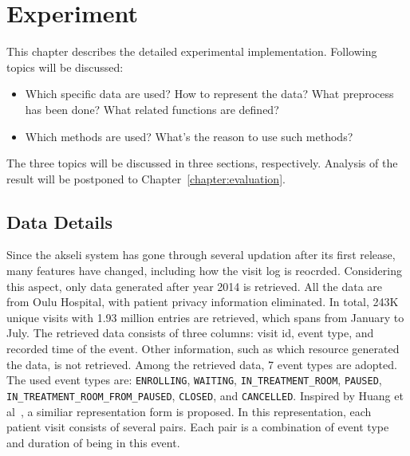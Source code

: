 \chapter{Experiment}
\label{chapter:Experiment}

	
This chapter describes the detailed experimental implementation. Following topics will be discussed:
\begin{itemize}
	\item	Which specific data are used? How to represent the data? What preprocess has been done? What related functions are defined?
	\item	Which methods are used? What's the reason to use such methods? 
\end{itemize}
The three topics will be discussed in three sections, respectively. Analysis of the result will be postponed to Chapter~\ref{chapter:evaluation}.

\section{Data Details}
Since the akseli system has gone through several updation after its first release, many features have changed, including how the visit log is reocrded. Considering this aspect, only data generated after year 2014 is retrieved. All the data are from Oulu Hospital, with patient privacy information eliminated. In total, 243K unique visits with 1.93 million entries are retrieved, which spans from January to July. The retrieved data consists of three columns: visit id, event type, and recorded time of the event. Other information, such as which resource generated the data, is not retrieved. Among the retrieved data, 7 event types are adopted. The used event types are: \texttt{ENROLLING}, \texttt{WAITING}, \texttt{IN\_TREATMENT\_ROOM}, \texttt{PAUSED}, \texttt{IN\_TREATMENT\_ROOM\_FROM\_PAUSED}, \texttt{CLOSED}, and \texttt{CANCELLED}.
Inspired by Huang et al~\cite{huang2012anomaly}, a similiar representation form is proposed. In this representation, each patient visit consists of several pairs. Each pair is a combination of event type and duration of being in this event.%